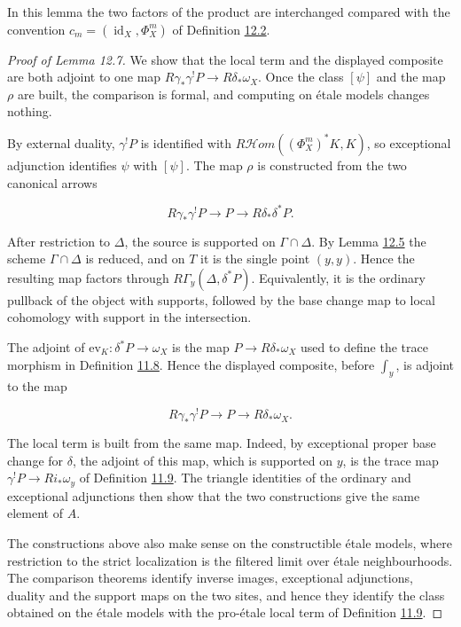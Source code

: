 \documentclass[11pt]{article}
\providecommand{\cHom}{}\renewcommand{\cHom}{R\mathcal{H}\!om}
\begin{document}
\label{bp247}%
In this lemma the two factors of the product are interchanged compared with the convention \(c_m=(\operatorname{id}_X,\Phi_X^m)\) of Definition \hyperref[bp232]{12.2}.

\begin{proof}[{Proof of Lemma 12.7}]\label{bp248}%
We show that the local term and the displayed composite are both adjoint to one map \(R\gamma_*\gamma^!P\to R\delta_*\omega_X\). Once the class \([\psi]\) and the map \(\rho\) are built, the comparison is formal, and computing on étale models changes nothing.

By external duality, \(\gamma^!P\) is identified with \(\cHom((\Phi_X^m)^*K,K)\), so exceptional adjunction identifies \(\psi\) with \([\psi]\). The map \(\rho\) is constructed from the two canonical arrows

\[
R\gamma_*\gamma^!P\longrightarrow P\longrightarrow R\delta_*\delta^*P.
\]

After restriction to \(\Delta\), the source is supported on \(\Gamma\cap\Delta\). By Lemma \hyperref[bp240]{12.5} the scheme \(\Gamma\cap\Delta\) is reduced, and on \(T\) it is the single point \((y,y)\). Hence the resulting map factors through \(R\Gamma_y(\Delta,\delta^*P)\). Equivalently, it is the ordinary pullback of the object with supports, followed by the base change map to local cohomology with support in the intersection.

The adjoint of \(\mathrm{ev}_K:\delta^*P\to\omega_X\) is the map \(P\to R\delta_*\omega_X\) used to define the trace morphism in Definition \hyperref[bp194]{11.8}. Hence the displayed composite, before \(\int_y\), is adjoint to the map

\[
R\gamma_*\gamma^!P\longrightarrow P\longrightarrow R\delta_*\omega_X.
\]

The local term is built from the same map. Indeed, by exceptional proper base change for \(\delta\), the adjoint of this map, which is supported on \(y\), is the trace map \(\gamma^!P\to Ri_*\omega_y\) of Definition \hyperref[bp197]{11.9}. The triangle identities of the ordinary and exceptional adjunctions then show that the two constructions give the same element of \(A\).

The constructions above also make sense on the constructible étale models, where restriction to the strict localization is the filtered limit over étale neighbourhoods. The comparison theorems identify inverse images, exceptional adjunctions, duality and the support maps on the two sites, and hence they identify the class obtained on the étale models with the pro-étale local term of Definition \hyperref[bp197]{11.9}.
\end{proof}
\end{document}
